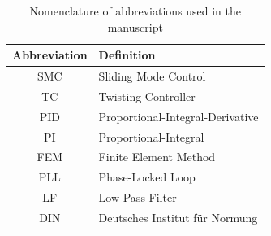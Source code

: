 \documentclass[lettersize,journal]{IEEEtran}
\begin{document}
\begin{table}[h]
    \centering
    \begin{tabular}{|c|l|}
        \hline
        \textbf{Abbreviation} & \textbf{Definition} \\ \hline
        SMC & Sliding Mode Control \\ \hline
        TC & Twisting Controller \\ \hline
        PID & Proportional-Integral-Derivative \\ \hline
        PI & Proportional-Integral \\ \hline
        FEM & Finite Element Method \\ \hline
        PLL & Phase-Locked Loop \\ \hline
        LF & Low-Pass Filter \\ \hline
        DIN & Deutsches Institut für Normung \\ \hline
    \end{tabular}
    \vspace{0.1cm}
    \caption{Nomenclature of abbreviations used in the manuscript}
    \label{T_nomenclature}
\end{table}
\end{document}
